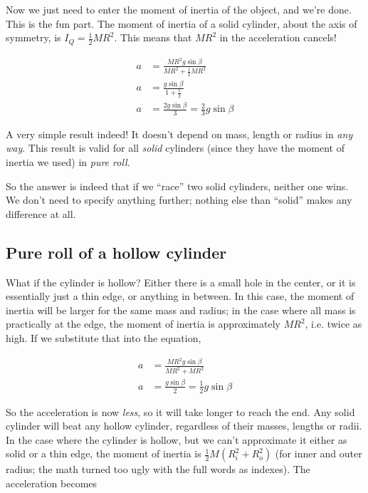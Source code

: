 Now we just need to enter the moment of inertia of the object, and we're done. This is the fun part. The moment of inertia of a solid cylinder, about the axis of symmetry, is $I_Q = \frac{1}{2} M R^2$. This means that $M R^2$ in the acceleration cancels!

\begin{align}
a &= \frac{M R^2 g \sin \beta}{M R^2 + \frac{1}{2} M R^2}\\
a &= \frac{g \sin \beta}{1 + \frac{1}{2}}\\
a &= \frac{2 g \sin \beta}{3} = \frac{2}{3} g \sin \beta
\end{align}

A very simple result indeed! It doesn't depend on mass, length or radius in \emph{any way}. This result is valid for all \emph{solid} cylinders (since they have the moment of inertia we used) in \emph{pure roll}.

So the answer is indeed that if we ``race'' two solid cylinders, neither one wins. We don't need to specify anything further; nothing else than ``solid'' makes any difference at all.

\subsection{Pure roll of a hollow cylinder}

What if the cylinder is hollow? Either there is a small hole in the center, or it is essentially just a thin edge, or anything in between. In this case, the moment of inertia will be larger for the same mass and radius; in the case where all mass is practically at the edge, the moment of inertia is approximately $M R^2$, i.e. twice as high. If we substitute that into the equation,

\begin{align}
a &= \frac{M R^2 g \sin \beta}{M R^2 + M R^2}\\
a &= \frac{g \sin \beta}{2} = \frac{1}{2} g \sin \beta
\end{align}

So the acceleration is now \emph{less}, so it will take longer to reach the end. Any solid cylinder will beat any hollow cylinder, regardless of their masses, lengths or radii.\\
In the case where the cylinder is hollow, but we can't approximate it either as solid or a thin edge, the moment of inertia is $\frac{1}{2} M(R_i^2 + R_o^2)$ (for inner and outer radius; the math turned too ugly with the full words as indexes). The acceleration becomes

